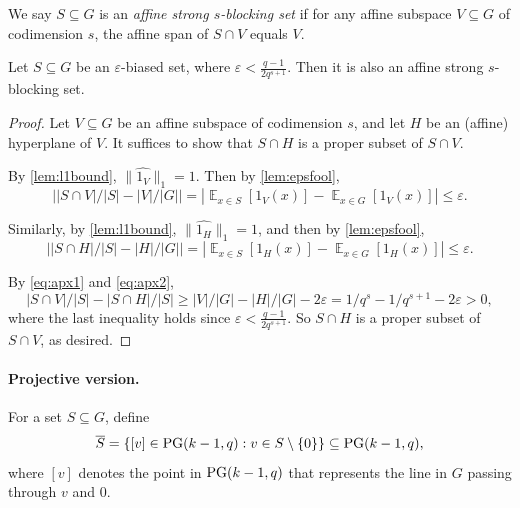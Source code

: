 \documentclass[11pt]{article}
\newif\ifdraft
\newcommand{\ZGnote}[1]{\ifdraft\textcolor{blue}{[Zeyu: #1]}\fi}
\newcommand{\eps}{\varepsilon}
\newcommand{\ex}{\mathop{{}\mathbb{E}}}
\begin{document}
We say $S\subseteq G$ is an \emph{affine strong $s$-blocking set} if for any affine subspace $V\subseteq G$ of codimension $s$, the affine span of $S\cap V$ equals $V$.

\begin{theorem}\label{thm:eqs-affine}
Let $S\subseteq G$ be an $\eps$-biased set, where $\eps<\frac{q-1}{2q^{s+1}}$. 
Then it is also an affine strong $s$-blocking set. 
\end{theorem}

\begin{proof}
Let $V\subseteq G$ be an affine subspace of codimension $s$, and let $H$ be an (affine) hyperplane of $V$. It suffices to show that $S\cap H$ is a proper subset of $S\cap V$.

By \cref{lem:l1bound}, $\|\widehat{1_{V}}\|_1=1$. Then by \cref{lem:epsfool},
\begin{equation}\label{eq:apx1}
\left| |S\cap V|/|S|-|V|/|G|\right|=
\left|\ex_{x\in S}[1_V(x)] - \ex_{x\in G}[1_V(x)]\right|\leq \eps.
\end{equation}

Similarly, by \cref{lem:l1bound}, $\|\widehat{1_{H}}\|_1=1$, and then by \cref{lem:epsfool},
\begin{equation}\label{eq:apx2}
\left| |S\cap H|/|S|-|H|/|G|\right|=
\left|\ex_{x\in S}[1_H(x)] - \ex_{x\in G}[1_H(x)]\right|\leq \eps.
\end{equation}

By \eqref{eq:apx1} and \eqref{eq:apx2},
\[
|S\cap V|/|S|-|S\cap H|/|S|
\geq |V|/|G|-|H|/|G|-2\eps
=1/q^{s}-1/q^{s+1}-2\eps>0,
\]
where the last inequality holds since $\eps<\frac{q-1}{2q^{s+1}}$.
So $S\cap H$ is a proper subset of $S\cap V$, as desired.
\end{proof}

\ZGnote{One can define $(s,\eps)$-blocking sets as those approximating the density in (affine or projective) subspaces of codimension $s$. The proof above basically shows that $\eps$-biased sets give such $(s,\eps)$-blocking sets, and that a set that is both $(s,\eps)$- and $(s+1,\eps)$-blocking is $s$-strong blocking.}


\paragraph{Projective version.}

For a set $S\subseteq G$, define 
\[
\overline{S}=\{[v] \in {\rm PG}(k-1,q): v\in S\setminus\{0\}\}\subseteq {\rm PG}(k-1,q),
\]
where $[v]$ denotes the point in ${\rm PG}(k-1,q)$ that represents the line in $G$ passing through $v$ and $0$.
\end{document}
